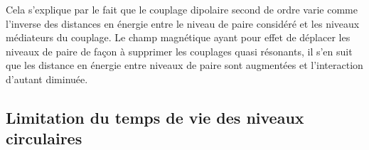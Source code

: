 Cela s'explique par le fait que le couplage dipolaire second de ordre varie comme l'inverse des distances en énergie entre le niveau de paire considéré et les niveaux médiateurs du couplage.
Le champ magnétique ayant pour effet de déplacer les niveaux de paire de façon à supprimer les couplages quasi résonants, il s'en suit que les distance en énergie entre niveaux de paire sont augmentées et l'interaction d'autant diminuée.
%

\subsection{Limitation du temps de vie des niveaux circulaires}

